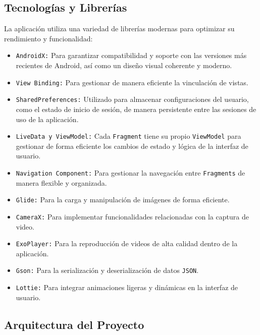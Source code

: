 
\subsection{Tecnologías y Librerías}

La aplicación utiliza una variedad de librerías modernas para optimizar su rendimiento y funcionalidad:

\begin{itemize}
    \item \texttt{AndroidX:} Para garantizar compatibilidad y soporte con las versiones más recientes de Android, así como un diseño visual coherente y moderno.
    \item \texttt{View Binding:} Para gestionar de manera eficiente la vinculación de vistas.
    \item \texttt{SharedPreferences:} Utilizado para almacenar configuraciones del usuario, como el estado de inicio de sesión, de manera persistente entre las sesiones de uso de la aplicación.
    \item \texttt{LiveData y ViewModel:} Cada  \texttt{Fragment} tiene su propio  \texttt{ViewModel} para gestionar de forma eficiente los cambios de estado y lógica de la interfaz de usuario.
    \item \texttt{Navigation Component:} Para gestionar la navegación entre  \texttt{Fragments} de manera flexible y organizada.
    \item \texttt{Glide:} Para la carga y manipulación de imágenes de forma eficiente.
    \item \texttt{CameraX:} Para implementar funcionalidades relacionadas con la captura de video.
    \item \texttt{ExoPlayer:} Para la reproducción de videos de alta calidad dentro de la aplicación.
    \item \texttt{Gson:} Para la serialización y deserialización de datos \texttt{JSON}.
    \item \texttt{Lottie:} Para integrar animaciones ligeras y dinámicas en la interfaz de usuario.
\end{itemize}


\subsection{Arquitectura del Proyecto}

